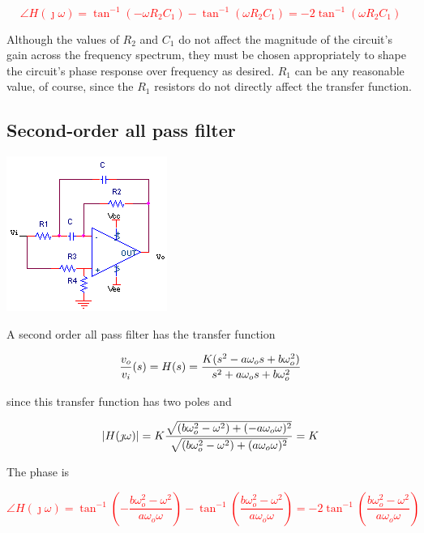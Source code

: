\textcolor{red}{
\begin{equation}
\angle H(\jmath\omega) = \tan^{-1}(-\omega R_2 C_1) - \tan^{-1}(\omega R_2 C_1) = -2\tan^{-1}(\omega R_2 C_1)
\label{eq:1storderallpassfilter_angle}
\end{equation}
}

Although the values of $R_2$ and $C_1$ do not affect the magnitude of the circuit's gain across the frequency spectrum, they must be chosen appropriately to shape the circuit's phase response over frequency as desired.
$R_1$ can be any reasonable value, of course, since the $R_1$ resistors do not directly affect the transfer function.

\subsection{Second-order all pass filter}
\begin{center}
	\includegraphics{schematics/2ndorder_allpass.PNG}
\end{center}
A second order all pass filter has the transfer function

\textcolor{red}{
\begin{equation}
\frac{\vout}{\vin}(s) = H(s) = \frac{K(s^2 - a\omega_{o}s + b\omega_{o}^2)}{s^2 + a\omega_{o}s + b\omega_{o}^2}
\label{eq:2ndorder_allpass}
\end{equation}
}

since this transfer function has two poles and

\begin{equation}
\left|H(\jmath\omega)\right| = K\frac{\sqrt{(b\omega_{o}^2-\omega^2) + (-a\omega_{o}\omega)^2}}{\sqrt{(b\omega_{o}^2-\omega^2) + (a\omega_{o}\omega)^2}} = K
\end{equation}

The phase is

\textcolor{red}{
\begin{equation}
\angle H(\jmath\omega) = \tan^{-1}\left(-\frac{b\omega_{o}^2-\omega^2}{a\omega_{o}\omega}\right) - \tan^{-1}\left(\frac{b\omega_{o}^2-\omega^2}{a\omega_{o}\omega}\right) = -2\tan^{-1}\left(\frac{b\omega_{o}^2-\omega^2}{a\omega_{o}\omega}\right)
\label{eq:2ndorder_allpass_angle}
\end{equation}
}

